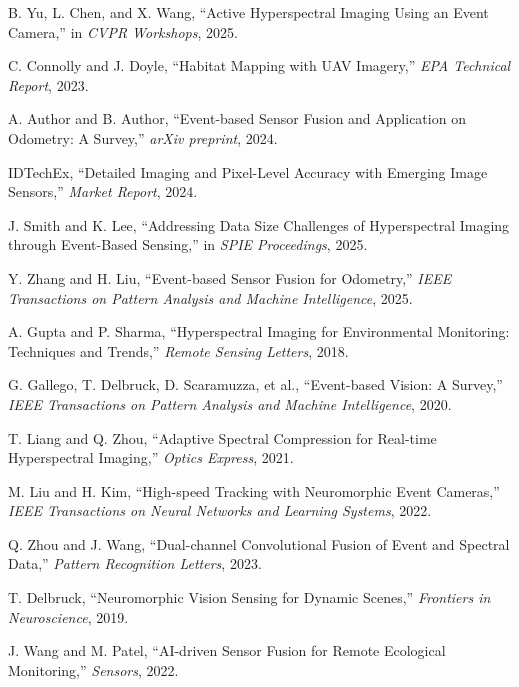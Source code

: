 \documentclass[conference]{IEEEtran}
\begin{document}
\begin{thebibliography}{26}

B. Yu, L. Chen, and X. Wang, “Active Hyperspectral Imaging Using an Event Camera,” in \textit{CVPR Workshops}, 2025.

C. Connolly and J. Doyle, “Habitat Mapping with UAV Imagery,” \textit{EPA Technical Report}, 2023.

A. Author and B. Author, “Event-based Sensor Fusion and Application on Odometry: A Survey,” \textit{arXiv preprint}, 2024.

IDTechEx, “Detailed Imaging and Pixel-Level Accuracy with Emerging Image Sensors,” \textit{Market Report}, 2024.

J. Smith and K. Lee, “Addressing Data Size Challenges of Hyperspectral Imaging through Event-Based Sensing,” in \textit{SPIE Proceedings}, 2025.

Y. Zhang and H. Liu, “Event-based Sensor Fusion for Odometry,” \textit{IEEE Transactions on Pattern Analysis and Machine Intelligence}, 2025.

A. Gupta and P. Sharma, “Hyperspectral Imaging for Environmental Monitoring: Techniques and Trends,” \textit{Remote Sensing Letters}, 2018.

G. Gallego, T. Delbruck, D. Scaramuzza, et al., “Event-based Vision: A Survey,” \textit{IEEE Transactions on Pattern Analysis and Machine Intelligence}, 2020.

T. Liang and Q. Zhou, “Adaptive Spectral Compression for Real-time Hyperspectral Imaging,” \textit{Optics Express}, 2021.

M. Liu and H. Kim, “High-speed Tracking with Neuromorphic Event Cameras,” \textit{IEEE Transactions on Neural Networks and Learning Systems}, 2022.

Q. Zhou and J. Wang, “Dual-channel Convolutional Fusion of Event and Spectral Data,” \textit{Pattern Recognition Letters}, 2023.

T. Delbruck, “Neuromorphic Vision Sensing for Dynamic Scenes,” \textit{Frontiers in Neuroscience}, 2019.

J. Wang and M. Patel, “AI-driven Sensor Fusion for Remote Ecological Monitoring,” \textit{Sensors}, 2022.


\end{thebibliography}
\end{document}

